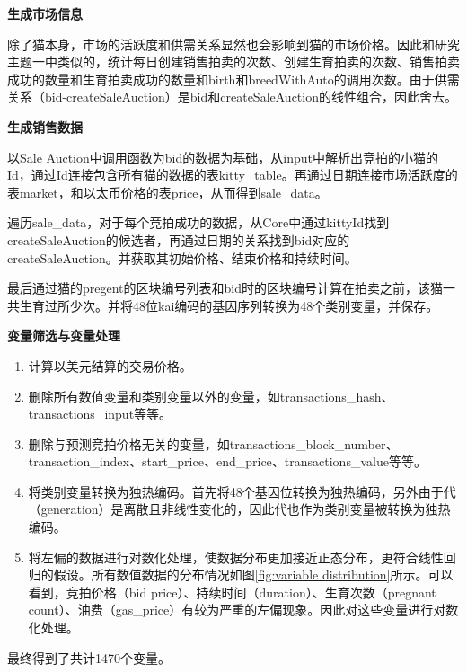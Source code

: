 \documentclass{myreport}
\begin{document}
\noindent \textbf{生成市场信息}


除了猫本身，市场的活跃度和供需关系显然也会影响到猫的市场价格。因此和研究主题一中类似的，统计每日创建销售拍卖的次数、创建生育拍卖的次数、销售拍卖成功的数量和生育拍卖成功的数量和birth和breedWithAuto的调用次数。由于供需关系（bid-createSaleAuction）是bid和createSaleAuction的线性组合，因此舍去。

\noindent \textbf{生成销售数据}


以Sale Auction中调用函数为bid的数据为基础，从input中解析出竞拍的小猫的Id，通过Id连接包含所有猫的数据的表kitty\_table。再通过日期连接市场活跃度的表market，和以太币价格的表price，从而得到sale\_data。

遍历sale\_data，对于每个竞拍成功的数据，从Core中通过kittyId找到createSaleAuction的候选者，再通过日期的关系找到bid对应的createSaleAuction。并获取其初始价格、结束价格和持续时间。

最后通过猫的pregent的区块编号列表和bid时的区块编号计算在拍卖之前，该猫一共生育过所少次。并将48位kai编码的基因序列转换为48个类别变量，并保存。


\noindent \textbf{变量筛选与变量处理}


\begin{enumerate}
\item 计算以美元结算的交易价格。
\item 删除所有数值变量和类别变量以外的变量，如transactions\_hash、transactions\_input等等。
\item 删除与预测竞拍价格无关的变量，如transactions\_block\_number、transaction\_index、start\_price、end\_price、transactions\_value等等。
\item 将类别变量转换为独热编码。首先将48个基因位转换为独热编码，另外由于代（generation）是离散且非线性变化的，因此代也作为类别变量被转换为独热编码。
\item 将左偏的数据进行对数化处理，使数据分布更加接近正态分布，更符合线性回归的假设。所有数值数据的分布情况如图\ref{fig:variable distribution}所示。可以看到，竞拍价格（bid price）、持续时间（duration）、生育次数（pregnant count）、油费（gas\_price）有较为严重的左偏现象。因此对这些变量进行对数化处理。
\end{enumerate}

最终得到了共计1470个变量。
\end{document}
